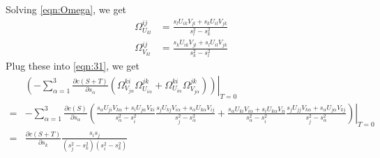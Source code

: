 \documentclass[10pt]{article}
\begin{document}
Solving \eqref{eqn:Omega}, we get
\begin{align}
	\Omega_{U_{kl}}^{ij} &= \frac{s_lU_{ik}V_{jl}+s_kU_{il}V_{jk}}{s_l^2-s_k^2} \nonumber \\
	\Omega_{V_{kl}}^{ij} &= \frac{s_kU_{ik}V_{jl}+s_lU_{il}V_{jk}}{s_k^2-s_l^2}
\end{align}
Plug these into \eqref{eqn:31}, we get
\begin{align}
	&\left.\left( -\sum_{\alpha=1}^3 \frac{\partial c(S+T)}{\partial s_\alpha} \left( \Omega_{V_{j\alpha}}^{ki}\Omega_{U_{i\alpha}}^{jk} + \Omega_{U_{i\alpha}}^{ki}\Omega_{V_{j\alpha}}^{jk} \right) \right)\right|_{T=0} \nonumber \\
	= &\left.-\sum_{\alpha=1}^3 \frac{\partial c(S)}{\partial s_\alpha} \left( \frac{s_\alpha U_{ji}V_{k\alpha} + s_iU_{j\alpha}V_{ki}}{s_\alpha^2-s_i^2} \frac{s_jU_{kj}V_{i\alpha} + s_\alpha U_{k\alpha}V_{ij}}{s_j^2-s_\alpha^2} + \frac{s_\alpha U_{ki}V_{i\alpha} + s_iU_{k\alpha}V_{ii}}{s_\alpha^2-s_i^2} \frac{s_jU_{jj}V_{k\alpha} + s_\alpha U_{j\alpha}V_{kj}}{s_j^2-s_\alpha^2} \right) \right|_{T=0} \nonumber \\
	= &\frac{\partial c(S+T)}{\partial s_k} \frac{s_is_j}{(s_j^2-s_k^2)(s_i^2-s_k^2)}
\end{align}
\end{document}
